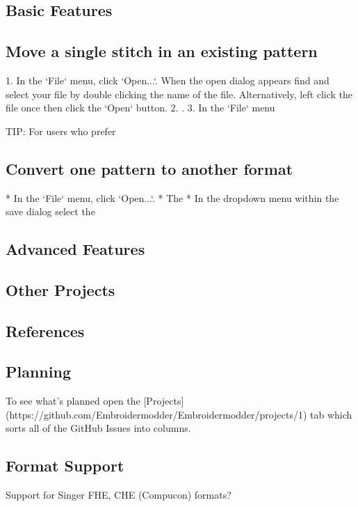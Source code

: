 \documentclass[10pt]{report}
\begin{document}
\subsection{Basic Features}

\subsection{Move a single stitch in an existing pattern}

1. In the `File` menu, click `Open...`. When the open dialog appears find and select your file by double clicking the name of the file. Alternatively, left click the file once then click the `Open` button.
2. .
3. In the `File` menu

TIP: For users who prefer

\subsection{Convert one pattern to another format}

* In the `File` menu, click `Open...`.
* The
* In the dropdown menu within the save dialog select the

\subsection{Advanced Features}

\subsection{Other Projects}

\subsection{References}

\subsection{Planning}

To see what's planned open the
[Projects](https://github.com/Embroidermodder/Embroidermodder/projects/1)
tab which sorts all of the GitHub Issues into columns.

\subsection{Format Support}

Support for Singer FHE, CHE (Compucon) formats?
\end{document}
